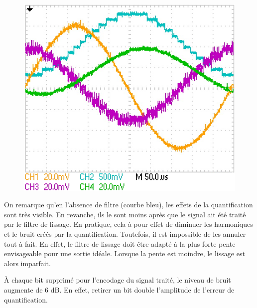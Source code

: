 \documentclass{article}
\begin{document}
\begin{figure}[h]
	\centering
	\includegraphics[width=.4\textwidth]{data/TEK0016_}
	\caption{}
	\label{fig:liss}
\end{figure}

On remarque qu'en l'absence de filtre (courbe bleu), les effets de la quantification sont très visible. En revanche, ils le sont moins après que le signal ait été traité par le filtre de lissage. En pratique, cela à pour effet de diminuer les harmoniques et le bruit créés par la quantification. Toutefois, il est impossible de les annuler tout à fait. En effet, le filtre de lissage doit être adapté à la plus forte pente envisageable pour une sortie idéale. Lorsque la pente est moindre, le lissage est alors imparfait.


À chaque bit supprimé pour l'encodage du signal traité, le niveau de bruit augmente de 6 dB. En effet, retirer un bit double l'amplitude de l'erreur de quantification.

\end{document}
